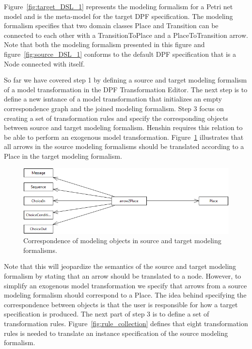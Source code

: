 Figure~\ref{fig:target_DSL_1} represents the modeling formalism for a
Petri net model and is the meta-model for the target DPF specification. The
modeling formalism specifies that two domain classes Place and Transition can
be connected to each other with a TransitionToPlace and a PlaceToTransition
arrow. Note that both the modeling formalism presented in this figure and
figure~\ref{fig:source_DSL_1} conforms to the default DPF specification that is
a Node connected with itself.

So far we have covered step 1 by defining a source and target modeling formalism
of a model transformation in the DPF Transformation Editor. The next step is to
define a new isntance of a model transformation that initializes an empty
correspondence graph and the joined modeling formalism. Step 3 focus on creating
a set of transformation rules and specify the corresponding objects between
source and target modeling formalism. Henshin requires this relation to be able
to perform an exogenous model transformation.
Figure~\ref{fig:correspondence_arrow} illustrates that all arrows in the source
modeling formalisms should be translated according to a Place in the target
modeling formalism.

\begin{figure}[H]
	\centering
	\includegraphics[scale=0.6]{./Figures/correspondenceObjects.png}
	\caption[Simplified joined specification]
	{Correspondence of modeling objects in source and target modeling formalisms.}
	\label{fig:correspondence_arrow}
\end{figure}

Note that this will jeopardize the semantics of the source and target modeling
formalism by stating that an arrow should be translated to a node. However, to
simplify an exogenous model transformation we specify that arrows from a source
modeling formalism should correspond to a Place. The idea behind specifying the
correspondence between objects is that the user is responsible for how a target
specification is produced. The next part of step 3 is to define a set of
transformation rules. Figure~\ref{fig:rule_collection} defines that eight
transformation rules is needed to translate an instance specification of the
source modeling formalism. 

